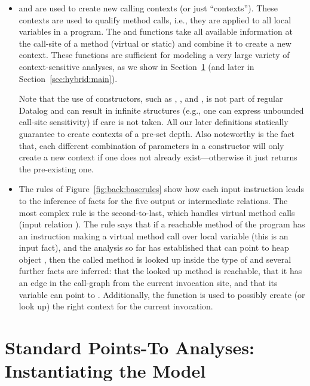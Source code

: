 \begin{itemize}
\item {} and  are used to create new calling contexts (or just ``contexts''). These contexts are used to qualify method calls, i.e., they are applied to all local variables in a program. The  and  functions take all available information at the call-site of a method (virtual or static) and combine it to create a new context. These functions are sufficient for modeling a very large variety of context-sensitive analyses, as we show in Section~\ref{sec:back:model-instances} (and later in Section~\ref{sec:hybrid:main}).

Note that the use of constructors, such as , , and , is not part of regular Datalog and can result in infinite structures (e.g., one can express unbounded call-site sensitivity) if care is not taken. All our later definitions statically guarantee to create contexts of a pre-set depth. Also noteworthy is the fact that, each different combination of parameters in a constructor will only create a new context if one does not already exist---otherwise it just returns the pre-existing one.

\item The rules of Figure~\ref{fig:back:baserules} show how each input instruction leads to the inference of facts for the five output or intermediate relations. The most complex rule is the second-to-last, which handles virtual method calls (input relation ). The rule says that if a reachable method of the program has an instruction making a virtual method call over local variable  (this is an input fact), and the analysis so far has established that  can point to heap object , then the called method is looked up inside the type of  and several further facts are inferred: that the looked up method is reachable, that it has an edge in the call-graph from the current invocation site, and that its  variable can point to . Additionally, the  function is used to possibly create (or look up) the right context for the current invocation.
\end{itemize}


\section{Standard Points-To Analyses: Instantiating the Model} 
\label{sec:back:model-instances}

